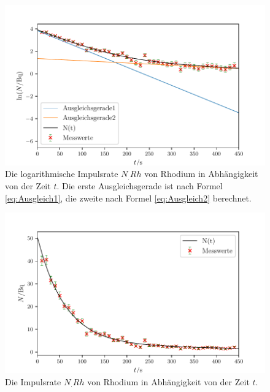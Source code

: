 \begin{figure}
	\centering
	\includegraphics[width=\linewidth-50pt,height=\textheight-50pt,keepaspectratio]{content/images/RhodiumLog.pdf}
	\caption{Die logarithmische Impulsrate $N_.{Rh}$ von Rhodium in Abhängigkeit von der Zeit $t$. Die erste Ausgleichsgerade ist nach Formel \eqref{eq:Ausgleich1}, die zweite nach Formel \eqref{eq:Ausgleich2} berechnet.}
	\label{fig:RhodiumLog}
\end{figure}

\begin{figure}
	\centering
	\includegraphics[width=\linewidth-50pt,height=\textheight-50pt,keepaspectratio]{content/images/Rhodium.pdf}
	\caption{Die Impulsrate $N_.{Rh}$ von Rhodium in Abhängigkeit von der Zeit $t$.}
	\label{fig:Rhodium}
\end{figure}

